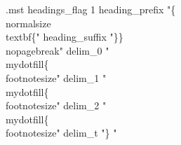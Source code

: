 \makeatletter
\renewenvironment{theindex}
{{\chapter{\indexname}\label{sec:app:index}}\par%
\@mkboth{\MakeUppercase\indexname}{\MakeUppercase\indexname}%
\parindent\z@
\parskip\z@ \@plus .5\p@\relax
\let\item\@idxitem
\setlength{\columnsep}{30pt}
\setlength{\parindent}{0em}
\let\item\@idxitem}
{\clearpage}
\renewcommand{\@idxitem}{\par\hangindent 15\p@}
\renewcommand{\subitem}{\par\hangindent 30\p@\hspace*{15pt}}
\makeatother

\begin{filecontents}{\jobname.mst}
headings_flag 1
heading_prefix "\{\\normalsize\\textbf\{"
heading_suffix "\}\}\\nopagebreak\n"
delim_0 "\\mydotfill\{\\footnotesize"
delim_1 "\\mydotfill\{\\footnotesize"
delim_2 "\\mydotfill\{\\footnotesize"
delim_t "\} "
\end{filecontents}

\renewcommand{\glsdescwidth}{12.5cm}

